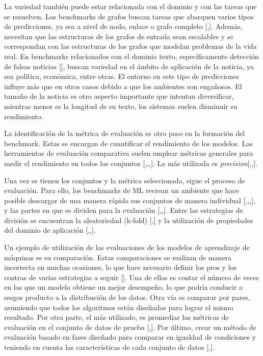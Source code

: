 La variedad también puede estar relacionada con el dominio y con las tareas que se resuelven. Los benchmarks de grafos buscan tareas que abarquen varios 
tipos de predicciones, ya sea a nivel de nodo, enlace o grafo completo [\cite{5},\cite{6}]. Además, necesitan que las estructuras de los grafos de entrada sean 
escalables y se correspondan con las estructuras de los grafos que modelan problemas de la vida real. En benchmarks relacionados con el dominio texto, 
específicamente detección de falsas noticias [\cite{4}], buscan variedad en el ámbito de aplicación de la noticia, ya sea política, económica, entre otras. El entorno 
en este tipo de predicciones influye más que en otros casos debido a que los ambientes son engañosos. El tamaño de la noticia es otro aspecto importante que intentan diversificar, 
mientras menor es la longitud de su texto, los sistemas suelen disminuir su rendimiento.

La identificación de la métrica de evaluación es otro paso en la formación del benchmark. Estas se encargan de cuantificar el rendimiento de los modelos. Las herramientas 
de evaluación comparativa suelen emplear métricas generales para medir el rendimiento en todos los conjuntos [\cite{3},\cite{7},\cite{5},\cite{6}]. La más 
utilizada es \textit{precision}[\cite{4},\cite{1},\cite{2}].

Una vez se tienen los conjuntos y la métrica seleccionada, sigue el proceso de evaluación. Para ello, los benchmarks de ML recrean un ambiente que hace posible 
descargar de una manera rápida sus conjuntos de manera individual [\cite{2},\cite{3},\cite{5},\cite{6}], y las partes en que se dividen para la evaluación 
[\cite{4},\cite{3},\cite{7}]. Entre las estrategias de división se encuentran la aleatoriedad (k-fold) [\cite{1},\cite{2}] y la utilización de propiedades del dominio de 
aplicación [\cite{4},\cite{5},\cite{6}].

Un ejemplo de utilización de las evaluaciones de los modelos de aprendizaje de máquinas es su comparación. Estas comparaciones se realizan de manera incorrecta en muchas 
ocasiones, lo que hace necesario definir los pros y los contras de varias estrategias a seguir [\cite{1}]. Una de ellas es contar el número de veces en las que un 
modelo obtiene un mejor desempeño, lo que podría conducir a sesgos producto a la distribución de los datos. Otra vía es comparar por pares, asumiendo que 
todos los algoritmos están diseñados para lograr el mismo resultado. Por otra parte, el más utilizado, es promediar las métricas de evaluación en el conjunto 
de datos de prueba [\cite{3},\cite{2}]. Por último, crear un método de evaluación basado en fases diseñado para comparar en igualdad de condiciones 
y teniendo en cuenta las características de cada conjunto de datos [\cite{1},\cite{7}].  

